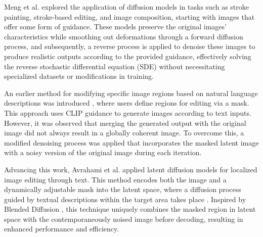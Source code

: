 Meng et al. \cite{Meng2021SDEdit} explored the application of diffusion models in tasks such as stroke painting, stroke-based editing, and image composition, starting with images that offer some form of guidance. These models preserve the original images' characteristics while smoothing out deformations through a forward diffusion process, and subsequently, a reverse process is applied to denoise these images to produce realistic outputs according to the provided guidance, effectively solving the reverse stochastic differential equation (SDE) without necessitating specialized datasets or modifications in training.

An earlier method for modifying specific image regions based on natural language descriptions was introduced \cite{avrahami2022blended}, where users define regions for editing via a mask. This approach uses CLIP guidance to generate images according to text inputs. However, it was observed that merging the generated output with the original image did not always result in a globally coherent image. To overcome this, a modified denoising process was applied that incorporates the masked latent image with a noisy version of the original image during each iteration.

Advancing this work, Avrahami et al. applied latent diffusion models for localized image editing through text. This method encodes both the image and a dynamically adjustable mask into the latent space, where a diffusion process guided by textual descriptions within the target area takes place \cite{Avrahami2022BlendedLatent}. Inspired by Blended Diffusion \cite{avrahami2022blended}, this technique uniquely combines the masked region in latent space with the contemporaneously noised image before decoding, resulting in enhanced performance and efficiency.

